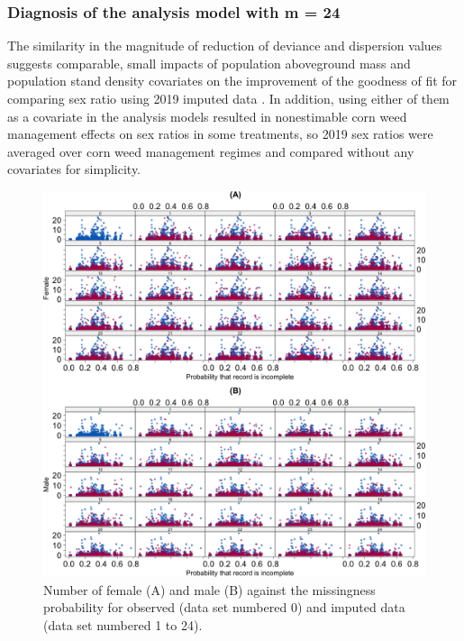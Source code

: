 \documentclass[
]{article}
\begin{document}
\hypertarget{diagnosis-of-the-analysis-model-with-m-24}{%
\subsubsection*{Diagnosis of the analysis model with m = 24}\label{diagnosis-of-the-analysis-model-with-m-24}}

The similarity in the magnitude of reduction of deviance and dispersion values suggests comparable, small impacts of population aboveground mass and population stand density covariates on the improvement of the goodness of fit for comparing sex ratio using 2019 imputed data \citep{nguyenDataImpactCropping2022}. In addition, using either of them as a covariate in the analysis models resulted in nonestimable corn weed management effects on sex ratios in some treatments, so 2019 sex ratios were averaged over corn weed management regimes and compared without any covariates for simplicity.

\begin{figure}[H]
\includegraphics[width=1\linewidth]{Manuscript_whole_files/figure-latex/kernel-xy-imp1-all-diag-1} \caption{Number of female (A) and male (B) against the missingness probability for observed (data set numbered 0) and imputed data (data set numbered 1 to 24).}\label{fig:kernel-xy-imp1-all-diag}
\end{figure}
\end{document}
